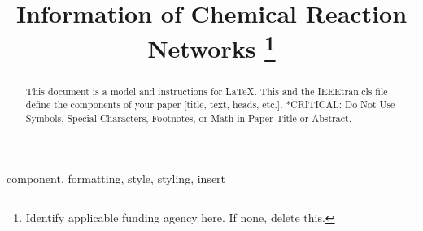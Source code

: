 \documentclass[conference]{IEEEtran}
\begin{document}
\title{Information of Chemical Reaction Networks
\thanks{Identify applicable funding agency here. If none, delete this.}
}

\author{
\and
{}
}

\maketitle

\begin{abstract}
This document is a model and instructions for \LaTeX.
This and the IEEEtran.cls file define the components of your paper [title, text, heads, etc.]. *CRITICAL: Do Not Use Symbols, Special Characters, Footnotes, 
or Math in Paper Title or Abstract.
\end{abstract}

\begin{IEEEkeywords}
component, formatting, style, styling, insert
\end{IEEEkeywords}
\end{document}
